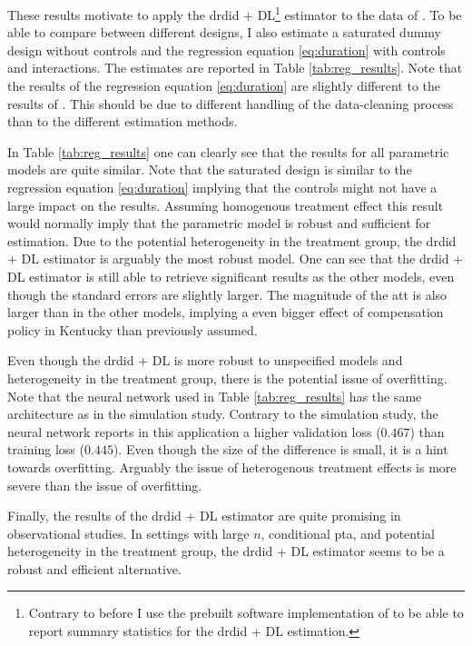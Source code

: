 These results motivate to apply the \ac{drdid} + DL\footnote[5]{Contrary to before I use the prebuilt software implementation of \citet*{doubleml2024R} to be able to report summary statistics for the \ac{drdid} + DL estimation.} estimator to the data of \citet{meyer1990workers}.
To be able to compare between different designs, I also estimate a saturated dummy design without controls and the regression equation \ref{eq:duration} with controls and interactions.
The estimates are reported in Table \ref{tab:reg_results}.
Note that the results of the regression equation \ref{eq:duration} are slightly different to the results of \citet{meyer1990workers}.
This should be due to different handling of the data-cleaning process than to the different estimation methods.



In Table \ref{tab:reg_results} one can clearly see that the results for all parametric models are quite similar.
Note that the saturated design is similar to the regression equation \ref{eq:duration} implying that the controls might not have a large impact on the results.
Assuming homogenous treatment effect this result would normally imply that the parametric model is robust and sufficient for estimation.
Due to the potential heterogeneity in the treatment group, the \ac{drdid} + DL estimator is arguably the most robust model.
One can see that the \ac{drdid} + DL estimator is still able to retrieve significant results as the other models, even though the standard errors are slightly larger.
The magnitude of the \ac{att} is also larger than in the other models, implying a even bigger effect of compensation policy in Kentucky than previously assumed.

Even though the \ac{drdid} + DL is more robust to unspecified models and heterogeneity in the treatment group, there is the potential issue of overfitting.
Note that the neural network used in Table \ref{tab:reg_results} has the same architecture as in the simulation study.
Contrary to the simulation study, the neural network reports in this application a higher validation loss ($0.467$) than training loss ($0.445$).
Even though the size of the difference is small, it is a hint towards overfitting.
Arguably the issue of heterogenous treatment effects is more severe than the issue of overfitting.

Finally, the results of the \ac{drdid} + DL estimator are quite promising in observational studies.
In settings with large $n$, conditional \ac{pta}, and potential heterogeneity in the treatment group, the \ac{drdid} + DL estimator seems to be a robust and efficient alternative.
